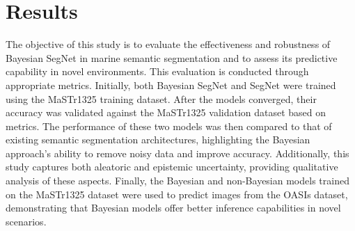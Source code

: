 \section{Results}
\label{section:results}
The objective of this study is to evaluate the effectiveness and robustness of Bayesian SegNet in marine semantic 
segmentation and to assess its predictive capability in novel environments. This evaluation is conducted through 
appropriate metrics. Initially, both Bayesian SegNet and SegNet were trained using the MaSTr1325 training dataset. 
After the models converged, their accuracy was validated against the MaSTr1325 validation dataset based on metrics. 
The performance of these two models was then compared to that of existing semantic segmentation architectures, 
highlighting the Bayesian approach's ability to remove noisy data and improve accuracy. Additionally, this study 
captures both aleatoric and epistemic uncertainty, providing qualitative analysis of these aspects. Finally, the 
Bayesian and non-Bayesian models trained on the MaSTr1325 dataset were used to predict images from the OASIs dataset, 
demonstrating that Bayesian models offer better inference capabilities in novel scenarios. 

